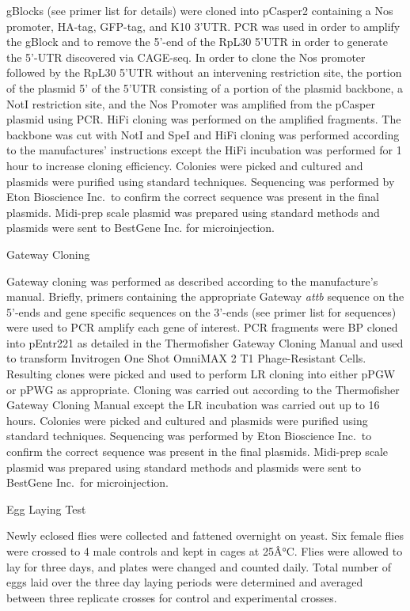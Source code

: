 \documentclass[12pt,twoside]{reedthesis}
\begin{document}
gBlocks (see primer list for details) were cloned into pCasper2
containing a Nos promoter, HA-tag, GFP-tag, and K10 3'UTR. PCR was used
in order to amplify the gBlock and to remove the 5'-end of the RpL30
5'UTR in order to generate the 5'-UTR discovered via CAGE-seq. In order
to clone the Nos promoter followed by the RpL30 5'UTR without an
intervening restriction site, the portion of the plasmid 5' of the 5'UTR
consisting of a portion of the plasmid backbone, a NotI restriction
site, and the Nos Promoter was amplified from the pCasper plasmid using
PCR. HiFi cloning was performed on the amplified fragments. The backbone
was cut with NotI and SpeI and HiFi cloning was performed according to
the manufactures' instructions except the HiFi incubation was performed
for 1 hour to increase cloning efficiency. Colonies were picked and
cultured and plasmids were purified using standard techniques.
Sequencing was performed by Eton Bioscience Inc.~to confirm the correct
sequence was present in the final plasmids. Midi-prep scale plasmid was
prepared using standard methods and plasmids were sent to BestGene Inc.
for microinjection.

{Gateway Cloning}

Gateway cloning was performed as described according to the
manufacture's manual. Briefly, primers containing the appropriate
Gateway \emph{attb} sequence on the 5'-ends and gene specific sequences on
the 3'-ends (see primer list for sequences) were used to PCR amplify
each gene of interest. PCR fragments were BP cloned into pEntr221 as
detailed in the Thermofisher Gateway Cloning Manual and used to
transform Invitrogen One Shot OmniMAX 2 T1 Phage-Resistant Cells.
Resulting clones were picked and used to perform LR cloning into either
pPGW or pPWG as appropriate. Cloning was carried out according to the
Thermofisher Gateway Cloning Manual except the LR incubation was carried
out up to 16 hours. Colonies were picked and cultured and plasmids were
purified using standard techniques. Sequencing was performed by Eton
Bioscience Inc.~to confirm the correct sequence was present in the final
plasmids. Midi-prep scale plasmid was prepared using standard methods
and plasmids were sent to BestGene Inc.~for microinjection.

{Egg Laying Test}

Newly eclosed flies were collected and fattened overnight on yeast. Six
female flies were crossed to 4 male controls and kept in cages at 25Â°C.
Flies were allowed to lay for three days, and plates were changed and
counted daily. Total number of eggs laid over the three day laying
periods were determined and averaged between three replicate crosses for
control and experimental crosses.
\end{document}
